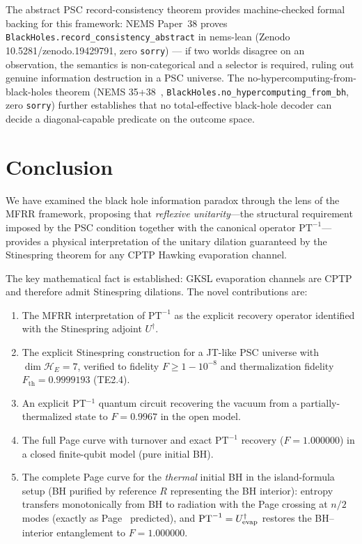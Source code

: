 \documentclass[11pt,twocolumn]{article}
\theoremstyle{remark}
\begin{document}
The abstract PSC record-consistency theorem provides machine-checked
formal backing for this framework: NEMS Paper~38
\cite{SpivackNEMS38} proves \texttt{BlackHoles.record\_consistency\_abstract}
in nems-lean (Zenodo 10.5281/zenodo.19429791, zero \texttt{sorry}) ---
if two worlds disagree on an observation, the semantics is non-categorical
and a selector is required, ruling out genuine information destruction in a
PSC universe. The no-hypercomputing-from-black-holes theorem
(NEMS 35+38~\cite{SpivackNEMS35,SpivackNEMS38},
\texttt{BlackHoles.no\_hypercomputing\_from\_bh}, zero \texttt{sorry})
further establishes that no total-effective black-hole decoder can decide a
diagonal-capable predicate on the outcome space.

\section{Conclusion}
\label{sec:conclusion}

We have examined the black hole information paradox through the lens of
the MFRR framework, proposing that \emph{reflexive unitarity}---the
structural requirement imposed by the PSC condition together with the
canonical operator $\mathrm{PT}^{-1}$---provides a physical interpretation
of the unitary dilation guaranteed by the Stinespring theorem for any
CPTP Hawking evaporation channel.

The key mathematical fact is established: GKSL evaporation channels are
CPTP and therefore admit Stinespring dilations. The novel contributions
are:
\begin{enumerate}
\item The MFRR interpretation of $\mathrm{PT}^{-1}$ as the explicit
  recovery operator identified with the Stinespring adjoint $U^\dagger$.
\item The explicit Stinespring construction for a JT-like PSC universe
  with $\dim\mathcal{H}_E = 7$, verified to fidelity $F\geq 1-10^{-8}$
  and thermalization fidelity $F_{\mathrm{th}} = 0.9999193$ (TE2.4).
\item An explicit PT$^{-1}$ quantum circuit recovering the vacuum
  from a partially-thermalized state to $F=0.9967$ in the open model.
\item The full Page curve with turnover and exact $\mathrm{PT}^{-1}$
  recovery ($F=1.000000$) in a closed finite-qubit model (pure initial BH).
\item The complete Page curve for the \emph{thermal} initial BH in
  the island-formula setup (BH purified by reference $R$ representing
  the BH interior): entropy transfers monotonically from BH to radiation
  with the Page crossing at $n/2$ modes (exactly as Page~\cite{Page1993}
  predicted), and $\mathrm{PT}^{-1} = U_{\rm evap}^\dagger$ restores
  the BH--interior entanglement to $F=1.000000$.
\end{enumerate}
\end{document}
